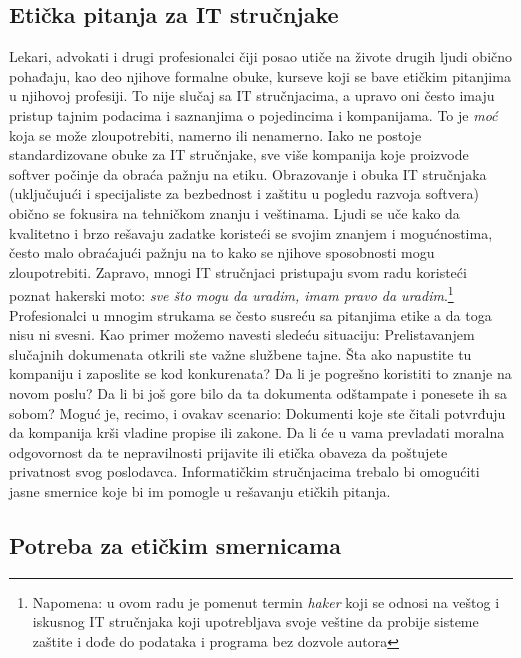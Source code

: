\documentclass[a4paper]{article}
\begin{document}
{\subsection{Etička pitanja za IT stručnjake}

Lekari, advokati i drugi profesionalci čiji posao utiče na živote drugih ljudi obično pohađaju, kao deo njihove formalne obuke, kurseve koji se bave etičkim pitanjima u njihovoj profesiji. To nije slučaj sa IT stru\-čnja\-ci\-ma, a upravo oni često imaju pristup tajnim podacima i saznanjima o pojedincima i kompanijama. To je \emph{moć} koja se može zloupotrebiti, namerno ili nenamerno. Iako ne postoje standardizovane obuke za IT stručnjake, sve više kompanija koje proizvode softver počinje da obraća pažnju na etiku.
Obrazovanje i obuka IT stručnjaka (uključujući i specijaliste za bezbednost i zaštitu u pogledu razvoja softvera) obično se fokusira na tehničkom znanju i veštinama. Ljudi se uče kako da kvalitetno i brzo rešavaju zadatke koristeći se svojim znanjem i mogućnostima, često malo obraćajući pažnju na to kako se njihove sposobnosti mogu zloupotrebiti. Zapravo, mnogi IT stručnjaci pristupaju svom radu koristeći poznat hakerski moto: \textit{sve što mogu da uradim, imam pravo da uradim}.\footnote{Napomena: u ovom radu je pomenut termin \textit{haker} koji se odnosi na veštog i iskusnog IT stručnjaka koji upotrebljava svoje veštine da probije sisteme zaštite i dođe do podataka i programa bez dozvole autora} 
Profesionalci u mnogim strukama se često susreću sa pitanjima etike a da toga nisu ni svesni. Kao primer možemo navesti sledeću situaciju: Prelistavanjem slučajnih dokumenata otkrili ste važne službene tajne. Šta ako napustite tu kompaniju i zaposlite se kod konkurenata? Da li je pogrešno koristiti to znanje na novom poslu? Da li bi još gore bilo da ta dokumenta odštampate i ponesete ih sa sobom?
Moguć je, recimo, i ovakav scenario: Dokumenti koje ste čitali potvrđuju da kompanija krši vladine propise ili zakone. Da li će u vama prevladati moralna odgovornost da te nepravilnosti prijavite ili etička obaveza da poštujete privatnost svog poslodavca.\cite{Schneider}\cite{Reynolds}
Informatičkim stručnjacima trebalo bi omogućiti jasne smernice koje bi im pomogle u rešavanju etičkih pitanja.

\subsection{Potreba za etičkim smernicama}

}
\end{document}
